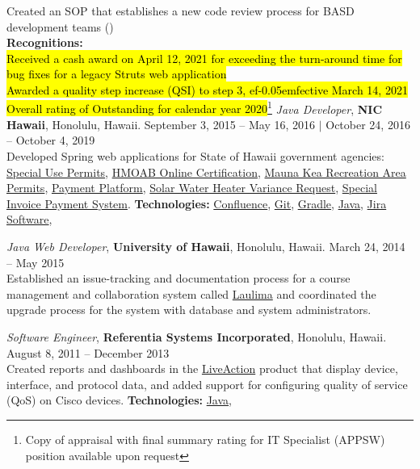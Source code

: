 \documentclass[10pt]{res} %
\begin{document}
\begin{resume}
\hspace*{3em}\faFile*[regular]\space Created an SOP that establishes a new code review process for BASD development teams ({\underline{}}) \\
\hspace*{2em} {\bf Recognitions:} \\
\hspace*{3em}\faAward\space \hl{Received a cash award on April 12, 2021 for exceeding the turn-around time for bug fixes for a legacy Struts web application} \\
\hspace*{3em}\faAward\space \hl{Awarded a quality step increase (QSI) to step 3, e{\normalfont f\kern-0.05emf}ective March 14, 2021} \\
\hspace*{3em}\faAward\space \hl{Overall rating of Outstanding for calendar year 2020}\footnote{Copy of appraisal with final summary rating for IT Specialist (APPSW) position available upon request}
\clearpage
{\sl Java Developer}, {\bf NIC Hawaii}, Honolulu, Hawaii. \hfill September 3, 2015 -- May 16, 2016 $|$ October 24, 2016 -- October 4, 2019 \\
Developed Spring web applications for State of Hawaii government agencies: \href{http://sups.ehawaii.gov}{\color{blue}Special Use Permits}, \href{http://hmoab.ehawaii.gov/cert}{\color{blue}HMOAB Online Certification}, \href{http://maunakea.ehawaii.gov}{\color{blue}Mauna Kea Recreation Area Permits}, \href{http://pay.ehawaii.gov}{\color{blue}Payment Platform}, \href{http://swhv.ehawaii.gov}{\color{blue}Solar Water Heater Variance Request}, \href{http://invoice.ehawaii.gov/charity}{\color{blue}Special Invoice Payment System}. {\bf Technologies:} \underline{Confluence}, \underline{Git}, \underline{Gradle}, \underline{Java}, \underline{Jira Software}, \underline{}

{\sl Java Web Developer}, {\bf University of Hawaii}, Honolulu, Hawaii. \hfill March 24, 2014 -- May 2015 \\
Established an issue-tracking and documentation process for a course management and collaboration system called \href{https://laulima.hawaii.edu}{\color{blue}Laulima} and coordinated the upgrade process for the system with database and system administrators.

{\sl Software Engineer}, {\bf Referentia Systems Incorporated}, Honolulu, Hawaii. \hfill August 8, 2011 -- December 2013 \\
Created reports and dashboards in the \href{http://www.liveaction.com}{\color{blue}LiveAction} product that display device, interface, and protocol data, and added support for configuring quality of service (QoS) on Cisco devices. {\bf Technologies:} \underline{Java}, \underline{}


\end{resume}
\end{document}
